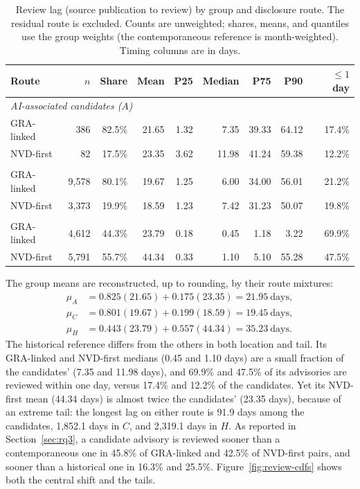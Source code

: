 \documentclass[smallextended,natbib]{svjour3}
\begin{document}
\begin{table}[t]
\caption{Review lag (source publication to review) by group and disclosure
route.  The residual route is excluded.  Counts are unweighted; shares, means,
and quantiles use the group weights (the contemporaneous reference is
month-weighted).  Timing columns are in days.}
\label{tab:route-lags}
\centering
 \setlength{\tabcolsep}{3pt}
\begin{tabular}{lrrrrrrrr}
\toprule
Route & $n$ & Share & Mean & P25 & Median & P75 & P90 & $\leq 1$ day \\
\midrule
\multicolumn{9}{l}{\textit{AI-associated candidates ($A$)}} \\
GRA-linked & 386 & 82.5\% & 21.65 & 1.32 & 7.35 & 39.33 & 64.12 & 17.4\% \\
NVD-first  &  82 & 17.5\% & 23.35 & 3.62 & 11.98 & 41.24 & 59.38 & 12.2\% \\
\addlinespace
\multicolumn{9}{l}{\textit{Contemporaneous reference ($C$)}} \\
GRA-linked & 9{,}578 & 80.1\% & 19.67 & 1.25 & 6.00 & 34.00 & 56.01 & 21.2\% \\
NVD-first  & 3{,}373 & 19.9\% & 18.59 & 1.23 & 7.42 & 31.23 & 50.07 & 19.8\% \\
\addlinespace
\multicolumn{9}{l}{\textit{Historical reference ($H$)}} \\
GRA-linked & 4{,}612 & 44.3\% & 23.79 & 0.18 & 0.45 & 1.18 & 3.22 & 69.9\% \\
NVD-first  & 5{,}791 & 55.7\% & 44.34 & 0.33 & 1.10 & 5.10 & 55.28 & 47.5\% \\
\bottomrule
\end{tabular}
\end{table}

The group means are reconstructed, up to rounding, by their route mixtures:
\begin{align}
\mu_A &=0.825(21.65)+0.175(23.35)=21.95\ \text{days}, \\
\mu_C &=0.801(19.67)+0.199(18.59)=19.45\ \text{days}, \\
\mu_H &=0.443(23.79)+0.557(44.34)=35.23\ \text{days}.
\label{eq:observed-mixtures}
\end{align}
The historical reference differs from the others in both location and tail.
Its GRA-linked and NVD-first medians (0.45 and 1.10 days) are a small fraction
of the candidates' (7.35 and 11.98 days), and 69.9\% and 47.5\% of its
advisories are reviewed within one day, versus 17.4\% and 12.2\% of the
candidates.  Yet its NVD-first mean (44.34 days) is almost twice the
candidates' (23.35 days), because of an extreme tail: the longest lag on either
route is 91.9 days among the candidates, 1{,}852.1 days in $C$, and 2{,}319.1
days in $H$.  As reported in Section~\ref{sec:rq3}, a candidate
advisory is reviewed sooner than a contemporaneous one in 45.8\% of GRA-linked
and 42.5\% of NVD-first pairs, and sooner than a historical one in 16.3\% and
25.5\%.  Figure~\ref{fig:review-cdfs} shows both the central shift and the
tails.
\end{document}
